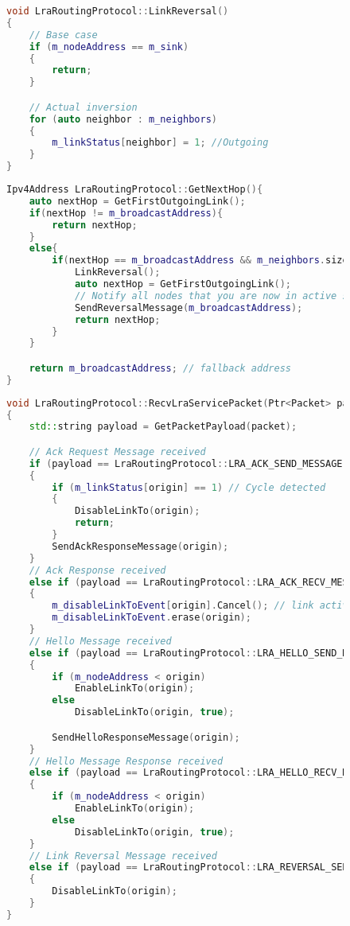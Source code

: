 \documentclass[../report.tex]{subfiles}
\begin{document}
\begin{figure}[H] %
\begin{lstlisting}[language=C++, caption={Link Reversal Method},captionpos=b]
void LraRoutingProtocol::LinkReversal()
{
    // Base case
    if (m_nodeAddress == m_sink)
    {
        return;
    }

    // Actual inversion
    for (auto neighbor : m_neighbors)
    {
        m_linkStatus[neighbor] = 1; //Outgoing
    }
}
\end{lstlisting}
\end{figure}

\begin{figure}[H] %
\begin{lstlisting}[language=C++, caption={Next Hop Find Method},captionpos=b]
Ipv4Address LraRoutingProtocol::GetNextHop(){
    auto nextHop = GetFirstOutgoingLink();
    if(nextHop != m_broadcastAddress){
        return nextHop;
    }
    else{
        if(nextHop == m_broadcastAddress && m_neighbors.size() > 0){
            LinkReversal();
            auto nextHop = GetFirstOutgoingLink();
            // Notify all nodes that you are now in active state.
            SendReversalMessage(m_broadcastAddress);
            return nextHop;
        }
    }

    return m_broadcastAddress; // fallback address
}
\end{lstlisting}
\end{figure}


\begin{figure}[H] %
\begin{lstlisting}[language=C++, caption={Service Packet Received Handling Method},captionpos=b]
void LraRoutingProtocol::RecvLraServicePacket(Ptr<Packet> packet, Ipv4Address origin)
{
    std::string payload = GetPacketPayload(packet);

    // Ack Request Message received
    if (payload == LraRoutingProtocol::LRA_ACK_SEND_MESSAGE)
    {
        if (m_linkStatus[origin] == 1) // Cycle detected
        {
            DisableLinkTo(origin);
            return;
        }
        SendAckResponseMessage(origin);
    }
    // Ack Response received
    else if (payload == LraRoutingProtocol::LRA_ACK_RECV_MESSAGE)
    {
        m_disableLinkToEvent[origin].Cancel(); // link active, avoid disabling it
        m_disableLinkToEvent.erase(origin);
    }
    // Hello Message received
    else if (payload == LraRoutingProtocol::LRA_HELLO_SEND_MESSAGE)
    {
        if (m_nodeAddress < origin)
            EnableLinkTo(origin);
        else
            DisableLinkTo(origin, true);

        SendHelloResponseMessage(origin);
    }
    // Hello Message Response received
    else if (payload == LraRoutingProtocol::LRA_HELLO_RECV_MESSAGE)
    {
        if (m_nodeAddress < origin)
            EnableLinkTo(origin);
        else
            DisableLinkTo(origin, true);
    }
    // Link Reversal Message received
    else if (payload == LraRoutingProtocol::LRA_REVERSAL_SEND_MESSAGE)
    {
        DisableLinkTo(origin);
    }
}
\end{lstlisting}
\end{figure}
\end{document}
